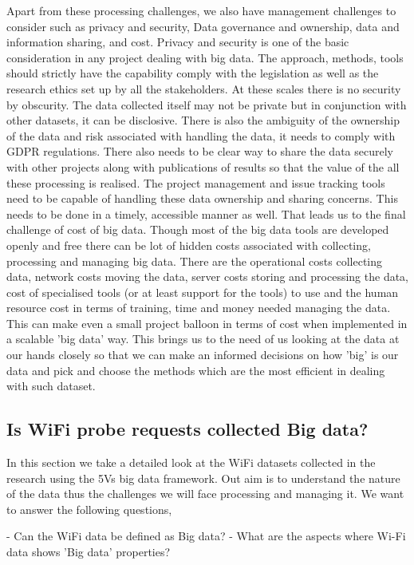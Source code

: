 Apart from these processing challenges, we also have management challenges to consider such as privacy and security, Data governance and ownership, data and information sharing, and cost.
Privacy and security is one of the basic consideration in any project dealing with big data.
The approach, methods, tools should strictly have the capability comply with the legislation as well as the research ethics set up by all the stakeholders.
At these scales there is no security by obscurity.
The data collected itself may not be private but in conjunction with other datasets, it can be disclosive.
There is also the ambiguity of the ownership of the data and risk associated with handling the data, it needs to comply with GDPR regulations.
There also needs to be clear way to share the data securely with other projects along with publications of results so that the value of the all these processing is realised.
The project management and issue tracking tools need to be capable of handling these data ownership and sharing concerns.
This needs to be done in a timely, accessible manner as well.
That leads us to the final challenge of cost of big data.
Though most of the big data tools are developed openly and free there can be lot of hidden costs associated with collecting, processing and managing big data.
There are the operational costs collecting data, network costs moving the data, server costs storing and processing the data, cost of specialised tools (or at least support for the tools) to use and the human resource cost in terms of training, time and money needed managing the data.
This can make even a small project balloon in terms of cost when implemented in a scalable 'big data' way.
This brings us to the need of us looking at the data at our hands closely so that we can make an informed decisions on how 'big' is our data and pick and choose the methods which are the most efficient in dealing with such dataset.

\subsection{Is WiFi probe requests collected Big data?}

In this section we take a detailed look at the WiFi datasets collected in the research using the 5Vs big data framework.
Out aim is to understand the nature of the data thus the challenges we will face processing and managing it.
We want to answer the following questions,

 - Can the WiFi data be defined as Big data? - What are the aspects where Wi-Fi data shows 'Big data' properties?

